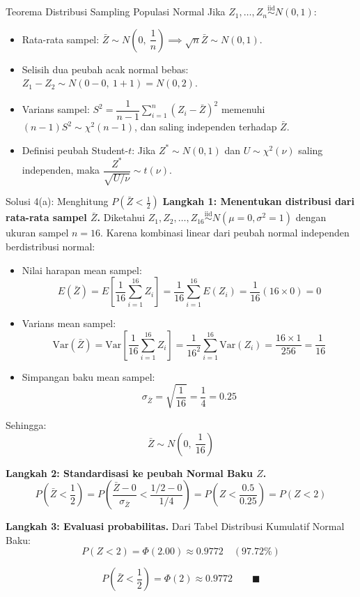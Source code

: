 \documentclass[10pt,twoside]{article}
\begin{document}
\begin{tipbox}{Teorema Distribusi Sampling Populasi Normal}
Jika $Z_1, \dots, Z_n \overset{\mathrm{iid}}{\sim} N(0, 1)$:
\begin{itemize}
  \item Rata-rata sampel: $\bar{Z} \sim N\left(0, \ \dfrac{1}{n}\right) \implies \sqrt{n}\bar{Z} \sim N(0, 1)$.
  \item Selisih dua peubah acak normal bebas: $Z_1 - Z_2 \sim N(0 - 0, \ 1 + 1) = N(0, 2)$.
  \item Varians sampel: $S^2 = \dfrac{1}{n-1}\sum_{i=1}^n (Z_i - \bar{Z})^2$ memenuhi $(n-1)S^2 \sim \chi^2(n-1)$, dan saling independen terhadap $\bar{Z}$.
  \item Definisi peubah Student-$t$: Jika $Z^* \sim N(0, 1)$ dan $U \sim \chi^2(\nu)$ saling independen, maka $\dfrac{Z^*}{\sqrt{U/\nu}} \sim t(\nu)$.
\end{itemize}
\end{tipbox}

\begin{solbox}{Solusi 4(a): Menghitung $P\left(\bar{Z} < \frac{1}{2}\right)$}
\textbf{Langkah 1: Menentukan distribusi dari rata-rata sampel $\bar{Z}$.}
Diketahui $Z_1, Z_2, \dots, Z_{16} \overset{\mathrm{iid}}{\sim} N(\mu = 0, \sigma^2 = 1)$ dengan ukuran sampel $n = 16$.
Karena kombinasi linear dari peubah normal independen berdistribusi normal:
\begin{itemize}
  \item Nilai harapan mean sampel:
  \[
  E(\bar{Z}) = E\left[\frac{1}{16}\sum_{i=1}^{16} Z_i\right] = \frac{1}{16}\sum_{i=1}^{16} E(Z_i) = \frac{1}{16}(16 \times 0) = 0
  \]
  \item Varians mean sampel:
  \[
  \mathrm{Var}(\bar{Z}) = \mathrm{Var}\left[\frac{1}{16}\sum_{i=1}^{16} Z_i\right] = \frac{1}{16^2}\sum_{i=1}^{16} \mathrm{Var}(Z_i) = \frac{16 \times 1}{256} = \frac{1}{16}
  \]
  \item Simpangan baku mean sampel:
  \[
  \sigma_{\bar{Z}} = \sqrt{\frac{1}{16}} = \frac{1}{4} = 0.25
  \]
\end{itemize}
Sehingga:
\[
\bar{Z} \sim N\left(0, \ \frac{1}{16}\right)
\]

\textbf{Langkah 2: Standardisasi ke peubah Normal Baku $Z$.}
\[
P\left(\bar{Z} < \frac{1}{2}\right) = P\left(\frac{\bar{Z} - 0}{\sigma_{\bar{Z}}} < \frac{1/2 - 0}{1/4}\right) = P\left(Z < \frac{0.5}{0.25}\right) = P(Z < 2)
\]

\textbf{Langkah 3: Evaluasi probabilitas.}
Dari Tabel Distribusi Kumulatif Normal Baku:
\[
P(Z < 2) = \Phi(2.00) \approx 0.9772 \quad (97.72\%)
\]

\[
\boxed{P\left(\bar{Z} < \frac{1}{2}\right) = \Phi(2) \approx 0.9772} \qquad \blacksquare
\]
\end{solbox}
\end{document}

